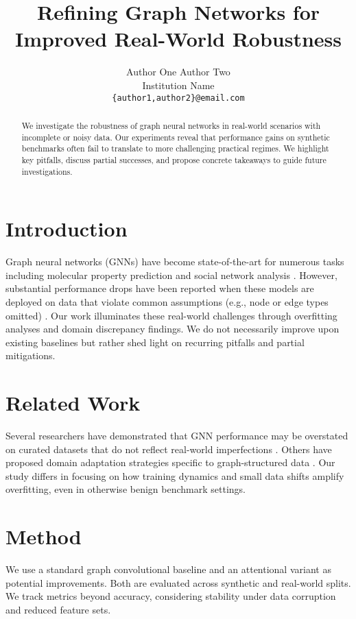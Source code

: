 \documentclass{article}
\title{Refining Graph Networks for Improved Real-World Robustness}
\author{Author One \quad Author Two \\
Institution Name \\
\texttt{\{author1,author2\}@email.com}
}
\date{}
\begin{document}
\maketitle

\begin{abstract}
We investigate the robustness of graph neural networks in real-world scenarios with incomplete or noisy data. Our experiments reveal that performance gains on synthetic benchmarks often fail to translate to more challenging practical regimes. We highlight key pitfalls, discuss partial successes, and propose concrete takeaways to guide future investigations.
\end{abstract}

\section{Introduction}
Graph neural networks (GNNs) have become state-of-the-art for numerous tasks including molecular property prediction and social network analysis \citep{gilmer2017neural,kipf2017semi,hamilton2017inductive}. However, substantial performance drops have been reported when these models are deployed on data that violate common assumptions (e.g., node or edge types omitted) \citep{hu2020open}. Our work illuminates these real-world challenges through overfitting analyses and domain discrepancy findings. We do not necessarily improve upon existing baselines but rather shed light on recurring pitfalls and partial mitigations.

\section{Related Work}
Several researchers have demonstrated that GNN performance may be overstated on curated datasets that do not reflect real-world imperfections \citep{shchur2018pitfalls,ying2018graph}. Others have proposed domain adaptation strategies specific to graph-structured data \citep{wu2020comprehensive}. Our study differs in focusing on how training dynamics and small data shifts amplify overfitting, even in otherwise benign benchmark settings.

\section{Method}
We use a standard graph convolutional baseline \citep{kipf2017semi} and an attentional variant as potential improvements. Both are evaluated across synthetic and real-world splits. We track metrics beyond accuracy, considering stability under data corruption and reduced feature sets.
\end{document}
